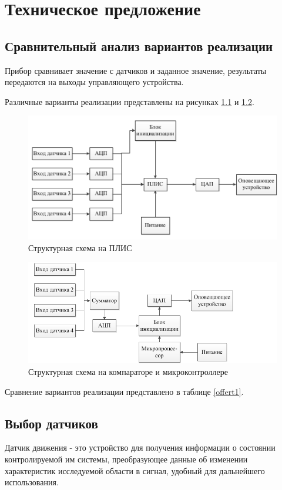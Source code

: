 \chapter{Техническое предложение}
	\section{Сравнительный анализ вариантов реализации}
		Прибор сравнивает значение с датчиков и заданное значение, результаты передаются на выходы управляющего устройства.

		Различные варианты реализации представлены на рисунках \ref{offerp1} и \ref{offerp2}.
		\begin{figure}[ht!]
			\centering
			\includegraphics[width=150mm]{src/pictures/offerp1.png}
			\caption{Структурная схема на ПЛИС}\label{offerp1}
		\end{figure}
		\begin{figure}[ht!]
			\centering
			\includegraphics[width=150mm]{src/pictures/offerp2.png}
			\caption{Структурная схема на компараторе и микроконтроллере}\label{offerp2}
		\end{figure}

		Сравнение вариантов реализации представлено в таблице \ref{offert1}.
		

	\section{Выбор датчиков}
		Датчик движения - это устройство для получения информации о состоянии контролируемой им системы, преобразующее данные об изменении характеристик исследуемой области в сигнал, удобный для дальнейшего использования.
